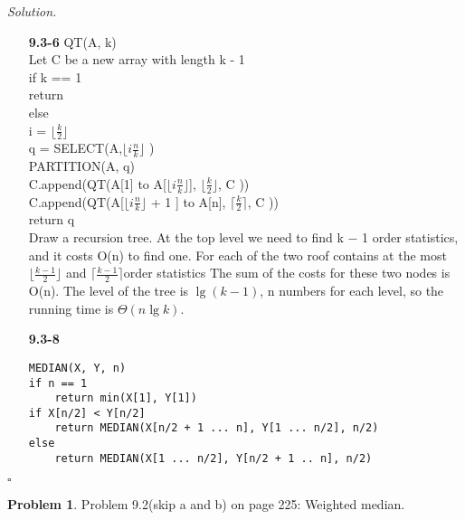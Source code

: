 \documentclass[11pt]{article}
\theoremstyle{definition}
\newtheorem{problem}{Problem}
\newenvironment{solution}{\noindent\emph{Solution.}}{\hfill$\square$}
\newcommand\tab[1][1cm]{\hspace*{#1}}
\begin{document}
\begin{solution}
\begin{enumerate}
\item[\textbf{9.3-6}]
QT(A, k) \\
Let C be a new array with length k - 1 \\
if k == 1 \\
	\tab return \\
else \\
	\tab i = $\lfloor \frac{k}{2} \rfloor$ \\
	\tab q = SELECT(A,$\lfloor i \frac{n}{k} \rfloor $ ) \\
	\tab PARTITION(A, q) \\
	\tab C.append(QT(A[1] to A[$\lfloor i \frac{n}{k} \rfloor $], $\lfloor \frac{k}{2} \rfloor$, C )) \\
	\tab C.append(QT(A[$\lfloor i \frac{n}{k} \rfloor $ + 1 ] to A[n], $\lceil \frac{k}{2} \rceil$, C )) \\
	\tab return q \\
Draw a recursion tree. At the top level we need to find k − 1
order statistics, and it costs O(n) to find one. For each of the two roof contains at the most $\lfloor \frac{k - 1}{2} \rfloor$ and $\lceil \frac{k - 1}{2} \rceil$order statistics The sum of the costs for these two nodes is O(n). The level of the tree is $\lg (k - 1)$, n numbers for each level, so the running time is $\Theta(n\lg k)$.

\item[\textbf{9.3-8}]
\
\begin{lstlisting}
MEDIAN(X, Y, n)
if n == 1
	return min(X[1], Y[1])
if X[n/2] < Y[n/2]
	return MEDIAN(X[n/2 + 1 ... n], Y[1 ... n/2], n/2)
else
	return MEDIAN(X[1 ... n/2], Y[n/2 + 1 .. n], n/2)	
\end{lstlisting}


\end{enumerate}

\end{solution}

\newpage



\begin{problem}Problem 9.2(skip a and b) on page 225: Weighted median. 
\end{problem}
\end{document}
